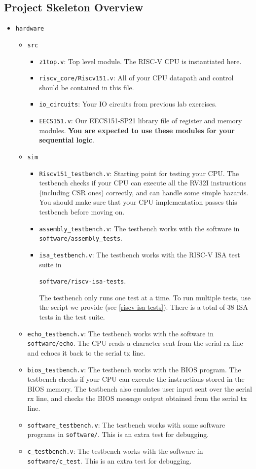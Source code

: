 \documentclass[11pt]{article}
\begin{document}
\subsection{Project Skeleton Overview}
\begin{itemize}
  \item \texttt{hardware}
    \begin{itemize}
      \item \texttt{src}
        \begin{itemize}
          \item \texttt{z1top.v}: Top level module. The RISC-V CPU is instantiated here.
          \item \texttt{riscv\_core/Riscv151.v}: All of your CPU datapath and control should be contained in this file.
          \item \texttt{io\_circuits}: Your IO circuits from previous lab exercises.
          \item \texttt{EECS151.v}: Our EECS151-SP21 library file of register and memory modules. \textbf{You are expected to use these modules for your sequential logic}.
        \end{itemize}
      \item \texttt{sim}
        \begin{itemize}
          \item \verb|Riscv151_testbench.v|: Starting point for testing your CPU. The testbench checks if your CPU can execute all the RV32I instructions (including CSR ones) correctly, and can handle some simple hazards. You should make sure that your CPU implementation passes this testbench before moving on.
          \item \verb|assembly_testbench.v|: The testbench works with the software in \texttt{software/assembly\_tests}.
          \item \verb|isa_testbench.v|: The testbench works with the RISC-V ISA test suite in

\texttt{software/riscv-isa-tests}.

The testbench only runs one test at a time. To run multiple tests, use the script we provide (see \ref{riscv-isa-tests}). There is a total of 38 ISA tests in the test suite.
        \end{itemize}
          \item \verb|echo_testbench.v|: The testbench works with the software in \texttt{software/echo}. The CPU reads a character sent from the serial rx line and echoes it back to the serial tx line.
          \item \verb|bios_testbench.v|: The testbench works with the BIOS program. The testbench checks if your CPU can execute the instructions stored in the BIOS memory. The testbench also emulates user input sent over the serial rx line, and checks the BIOS message output obtained from the serial tx line.
          \item \verb|software_testbench.v|: The testbench works with some software programs in \texttt{software/}. This is an extra test for debugging.
          \item \verb|c_testbench.v|: The testbench works with the software in \texttt{software/c\_test}. This is an extra test for debugging.


\end{itemize}
\end{itemize}
\end{document}
